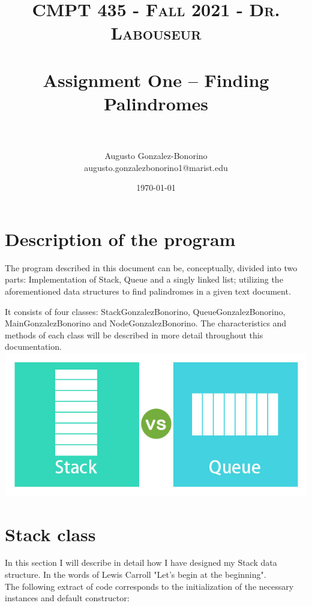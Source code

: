\documentclass[letterpaper, 10pt]{article}
\title{	
   \normalfont \normalsize 
   \textsc{CMPT 435 - Fall 2021 - Dr. Labouseur} \\[10pt] %
   \horrule{0.5pt} \\[0.25cm] 	%
   \huge Assignment One -- Finding Palindromes \\     	    %
   \horrule{0.5pt} \\[0.25cm] 	%
}
\author{Augusto Gonzalez-Bonorino \\ \normalsize augusto.gonzalezbonorino1@marist.edu}
\date{\normalsize\today} 	%
\begin{document}
\maketitle %



\section{Description of the program}

The program described in this document can be, conceptually, divided into two parts: Implementation of Stack, Queue and a singly linked list; utilizing the aforementioned data structures to find palindromes in a given text document.

It consists of four classes: StackGonzalezBonorino, QueueGonzalezBonorino, MainGonzalezBonorino and NodeGonzalezBonorino. The characteristics and methods of each class will be described in more detail throughout this documentation. \\

\includegraphics[scale=0.5]{images/Stack.jpg}

\pagebreak
\section{Stack class}

In this section I will describe in detail how I have designed my Stack data structure. In the words of Lewis Carroll "Let's begin at the beginning". 
\\
The following extract of code corresponds to the initialization of the necessary instances and default constructor:
\end{document}
